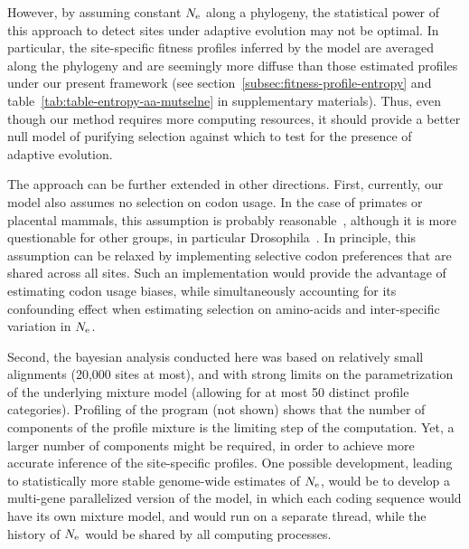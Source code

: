 However, by assuming constant $N_{\text{e}}$ along a phylogeny, the statistical power of this approach to detect sites under adaptive evolution may not be optimal.
In particular, the site-specific fitness profiles inferred by the model are averaged along the phylogeny and are seemingly more diffuse than those estimated profiles under our present framework (see section~\ref{subsec:fitness-profile-entropy} and table~\ref{tab:table-entropy-aa-mutselne} in supplementary materials).
Thus, even though our method requires more computing resources, it should provide a better null model of purifying selection against which to test for the presence of adaptive evolution.

The approach can be further extended in other directions.
First, currently, our model also assumes no selection on codon usage.
In the case of primates or placental mammals, this assumption is probably reasonable~\citep{Yang2008}, although it is more questionable for other groups, in particular Drosophila~\citep{Duret1999,Plotkin2011}.
In principle, this assumption can be relaxed by implementing selective codon preferences that are shared across all sites.
Such an implementation would provide the advantage of estimating codon usage biases, while simultaneously accounting for its confounding effect when estimating selection on amino-acids and inter-specific variation in $N_{\text{e}}$.

Second, the bayesian analysis conducted here was based on relatively small alignments (20,000 sites at most), and with strong limits on the parametrization of the underlying mixture model (allowing for at most 50 distinct profile categories).
Profiling of the program (not shown) shows that the number of components of the profile mixture is the limiting step of the computation.
Yet, a larger number of components might be required, in order to achieve more accurate inference of the site-specific profiles.
One possible development, leading to statistically more stable genome-wide estimates of $N_{\text{e}}$, would be to develop a multi-gene parallelized version of the model, in which each coding sequence would have its own mixture model, and would run on a separate thread, while the history of $N_{\text{e}}$ would be shared by all computing processes.

